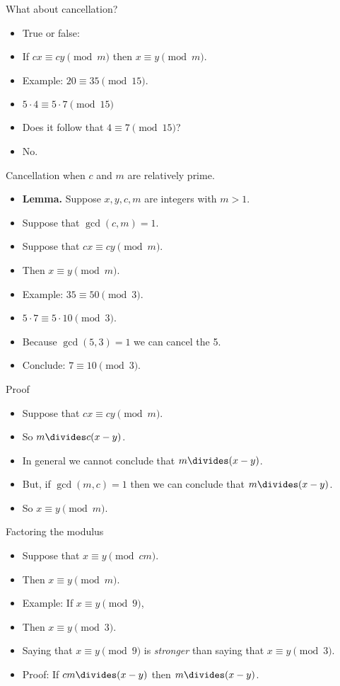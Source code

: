 \documentclass{beamer}
\begin{document}
\begin{frame}{What about cancellation?}

\begin{itemize}
  \item True or false:
  \item If $cx \equiv cy \pmod m$ then $x\equiv y \pmod m$.
  \item Example: $20 \equiv 35 \pmod {15}$.
  \item $5\cdot 4 \equiv 5 \cdot 7 \pmod {15}$
  \item Does it follow that $4 \equiv 7 \pmod {15}$?
  \item No.
\end{itemize}

\end{frame}

\begin{frame}{Cancellation when $c$ and $m$ are relatively prime.}
\begin{itemize}
  \item \textbf{Lemma.} Suppose $x,y,c,m$ are integers with $m>1$.
  \item Suppose that $\gcd(c, m) = 1$.
  \item Suppose that $cx \equiv cy \pmod m$.
  \item Then $x\equiv y \pmod m$.
  \item Example: $35 \equiv 50 \pmod 3$.
  \item $5\cdot 7 \equiv 5 \cdot 10 \pmod 3$.
  \item Because $\gcd(5,3) = 1$ we can cancel the 5.
  \item Conclude: $7\equiv 10 \pmod 3$.
\end{itemize}
\end{frame}

\begin{frame}{Proof}
\begin{itemize}
  \item Suppose that $cx \equiv cy \pmod m$.
  \item So $m \divides c(x-y)$.
  \item In general we cannot conclude that $m \divides (x-y)$.
  \item But, if $\gcd(m,c) = 1$ then we can conclude that $m\divides (x-y)$.
  \item So $x\equiv y \pmod m$.
\end{itemize}
\end{frame}

\begin{frame}{Factoring the modulus}
\begin{itemize}
  \item Suppose that $x\equiv y \pmod {cm}$.
  \item Then $x\equiv y \pmod m$.
  \item Example: If $x\equiv y \pmod 9$,
  \item Then $x\equiv y \pmod 3$.
  \item Saying that $x\equiv y \pmod 9$ is \emph{stronger} than saying that $x\equiv y \pmod 3$.
  \item Proof: If $cm \divides (x-y)$ then $m\divides (x-y)$.
\end{itemize}
\end{frame}
\end{document}
